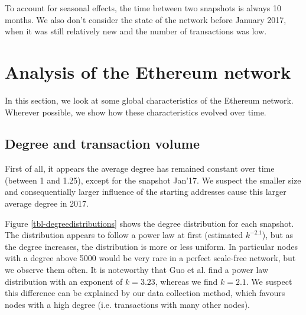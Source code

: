 \documentclass[10pt,a4paper]{article}
\begin{document}
\begin{multicols}{2}
To account for seasonal effects, the time between two snapshots is always 10 months. We also don't consider the state of the network before January 2017, when it was still relatively new and the number of transactions was low.

\section{Analysis of the Ethereum network}
In this section, we look at some global characteristics of the Ethereum network. Wherever possible, we show how these characteristics evolved over time.
\subsection{Degree and transaction volume}
First of all, it appears the average degree has remained constant over time (between 1 and 1.25), except for the snapshot Jan'17. We suspect the smaller size and consequentially larger influence of the starting addresses cause this larger average degree in 2017.

Figure \ref{tbl-degreedistributions} shows the degree distribution for each snapshot. The distribution appears to follow a power law at first (estimated $k^{-2.1}$), but as the degree increases, the distribution is more or less uniform. In particular nodes with a degree above 5000 would be very rare in a perfect scale-free network, but we observe them often. It is noteworthy that Guo et al. \cite{GUO201958} find a power law distribution with an exponent of $k = 3.23$, whereas we find $k=2.1$. We suspect this difference can be explained by our data collection method, which favours nodes with a high degree (i.e. transactions with many other nodes).
\end{multicols}
\end{document}

